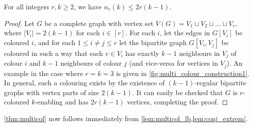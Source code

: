 \documentclass[12pt,a4paper]{article}
\begin{document}
\begin{lemma} \label{lem:conj_extrem}
    For all integers $r, k \geq 2$, we have $n_r(k) \leq 2r(k-1)$.
\end{lemma}
\begin{proof}
    Let $G$ be a complete graph with vertex set $V(G) = V_1 \sqcup V_2 \sqcup \dots \sqcup V_r$, where $|V_i| = 2(k-1)$ for each $i \in [r]$. For each $i$, let the edges in $G[V_i]$ be coloured $i$, and for each $1 \leq i \neq j \leq r$ let the bipartite graph $G[V_i, V_j]$ be coloured in such a way that each $v \in V_i$ has exactly $k-1$ neighbours in $V_j$ of colour $i$ and $k-1$ neighbours of colour $j$ (and vice-versa for vertices in $V_j$). An example in the case where $r=k=3$ is given in \cref{fig:multi_colour_construction1}. In general, such a colouring exists by the existence of $(k-1)$-regular bipartite graphs with vertex parts of size $2(k-1)$. It can easily be checked that $G$ is $r$-coloured $k$-enabling and has $2r(k-1)$ vertices, completing the proof.
\end{proof}

\cref{thm:multicol} now follows immediately from \cref{lem:multicol_lb,lem:conj_extrem}.
\end{document}

